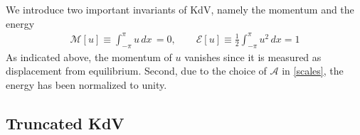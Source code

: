 \documentclass[11pt]{article}
\newcommand{\dx}{\, dx}
\newcommand{\En}{\mathcal{E}}
\newcommand{\Mo}{\mathcal{M}}
\newcommand{\ampscale}{\mathcal{A}}
\newcommand{\sympJ}{\mathcal{J}}
\newcommand{\vard}[2]{\frac{\delta #1}{\delta #2}}
\newcommand{\Ham}{\mathcal{H}}
\newcommand{\Hup}{\Ham^{-}}
\newcommand{\Hdn}{\Ham^{+}}
\newcommand{\Fcnl}{\mathcal{F}}
\begin{document}
We introduce two important invariants of KdV, namely the momentum and the energy
\begin{align}
\label{MomEn}
\Mo[u] \equiv \int_{-\pi}^{\pi} u \dx \, = 0 , \qquad
\En[u] \equiv \frac{1}{2} \int_{-\pi}^{\pi} u^2 \dx = 1
\end{align}
As indicated above, the momentum of $u$ vanishes since it is measured as displacement from equilibrium. Second, due to the choice of $\ampscale$ in \eqref{scales}, the energy has been normalized to unity.


\begin{comment}
The evolution of any functional $\Fcnl[u]$ is given by 
\begin{align}
\partial_t \Fcnl  = \{ \Fcnl, \Ham \} = \int_{-\pi}^{\pi} \vard{\Fcnl}{u} \sympJ \vard{\Ham}{u} \dx
\end{align}
where again $\Ham = \Hup$ if $t<0$, and $\Ham = \Hdn$ if $t>0$ and $\{\}$ is the Poisson bracket induced by $\sympJ$.
\end{comment}



\subsection{Truncated KdV}
\label{tKdVSec}
\end{document}

